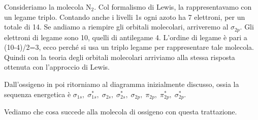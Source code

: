 Consideriamo la molecola N$_2$. Col formalismo di Lewis, la rappresentavamo con un legame triplo. Contando anche i livelli 1s ogni azoto ha 7 elettroni, per un totale di 14. Se andiamo a riempire gli orbitali molecolari, arriveremo al $\sigma_{2p}$. Gli elettroni di legame sono 10, quelli di antilegame 4. L'ordine di legame è pari a (10-4)/2=3, ecco perché si usa un triplo legame per rappresentare tale molecola. Quindi con la teoria degli orbitali molecolari arriviamo alla stessa risposta ottenuta con l'approccio di Lewis.

\vspace{0.2cm}
Dall'ossigeno in poi ritorniamo al diagramma inizialmente discusso, ossia la sequenza energetica è $\sigma_{1s}, \; \sigma^*_{1s}, \; \sigma_{2s}, \; \sigma^*_{2s}, \; \sigma_{2p}, \; \pi_{2p}, \; \pi^*_{2p}, \; \sigma^*_{2p}$.

Vediamo che cosa succede alla molecola di ossigeno con questa trattazione.

